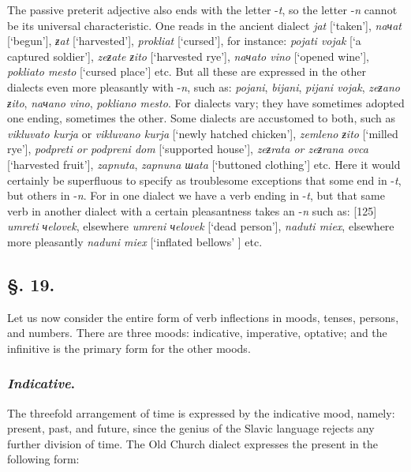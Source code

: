 The passive preterit adjective also ends with the letter -\textit{t}, so the letter -\textit{n} cannot be its universal characteristic. One reads in the ancient dialect \textit{jat} [‘taken’], \textit{naчat} [‘begun’], \textit{ƶat} [‘harvested’], \textit{prokliat} [‘cursed’], for instance: \textit{pojati vojak} [‘a captured soldier’], \textit{zeƶate ƶito} [‘harvested rye’], \textit{naчato vino} [‘opened wine’], \textit{pokliato mesto} [‘cursed place’] etc. But all these are expressed in the other dialects even more pleasantly with -\textit{n}, such as: \textit{pojani}, \textit{bijani}, \textit{pijani vojak}, \textit{zeƶano ƶito}, \textit{naчano vino}, \textit{pokliano mesto}. For dialects vary; they have sometimes adopted one ending, sometimes the other. Some dialects are accustomed to both, such as \textit{vikluvato kurja} or \textit{vikluvano kurja} [‘newly hatched chicken’], \textit{zemleno ƶito} [‘milled rye’], \textit{podpreti or podpreni dom} [‘supported house’], \textit{zeƶrata or zeƶrana ovca} [‘harvested fruit’], \textit{zapnuta}, \textit{zapnuna шata} [‘buttoned clothing’] etc. Here it would certainly be superfluous to specify as troublesome exceptions that some end in -\textit{t}, but others in -\textit{n}. For in one dialect we have a verb ending in -\textit{t}, but that same verb in another dialect with a certain pleasantness takes an -\textit{n} such as: [125] \textit{umreti чelovek}, elsewhere \textit{umreni чelovek} [‘dead person’], \textit{naduti miex}, elsewhere more pleasantly \textit{naduni miex} [‘inflated bellows’ ] etc.

\subsection*{\hspace*{\fill}§. 19.\hspace*{\fill}}

Let us now consider the entire form of verb inflections in moods, tenses, persons, and numbers. There are three moods: indicative, imperative, optative; and the infinitive is the primary form for the other moods.

\subsubsection*{\textit{Indicative}.}

The threefold arrangement of time is expressed by the indicative mood, name\-ly: present, past, and future, since the genius of the Slavic language rejects any further division of time. The Old Church dialect expresses the present in the following form:

